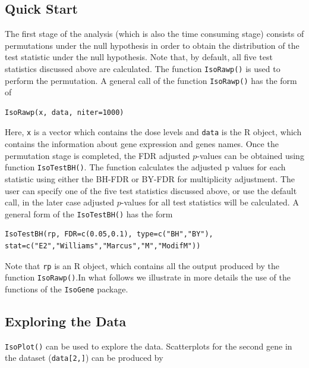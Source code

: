 \documentclass[10pt]{article}
\newenvironment{boxit}{\begin{lrbox}{\savepar}
\begin{minipage}[b]{5.0in}}
{\end{minipage}\end{lrbox}\fbox{\usebox{\savepar}}}
\begin{document}
\subsection{Quick Start}
The first stage of the analysis (which is also the time consuming stage) consists of permutations under the null hypothesis in order to obtain the distribution of the test statistic under the null hypothesis. Note that, by default, all five test statistics discussed above are calculated. The function \texttt{IsoRawp()} is used to perform the permutation. A general call of the function \texttt{IsoRawp()} has the form of
\begin{center}
\begin{boxit}
\begin{verbatim}
IsoRawp(x, data, niter=1000)
\end{verbatim}
\end{boxit}
\end{center}
Here, \texttt{x} is a vector which contains the dose levels and \texttt{data} is the R object, which contains the information about gene expression and genes names. Once the permutation stage is completed, the FDR adjusted $p$-values can be obtained using function \texttt{IsoTestBH()}. The function calculates the adjusted p values for each statistic using either the BH-FDR or BY-FDR for multiplicity adjustment. The user can specify one of the five test statistics discussed above, or use the default call, in the later case adjusted $p$-values for all test statistics will be calculated. A general form of the \texttt{IsoTestBH()} has the form
\begin{center}
\begin{boxit}
\begin{verbatim}
IsoTestBH(rp, FDR=c(0.05,0.1), type=c("BH","BY"),
stat=c("E2","Williams","Marcus","M","ModifM"))
\end{verbatim}
\end{boxit}
\end{center}
Note that \texttt{rp} is an R object, which contains all the output produced by the function \texttt{IsoRawp()}.\newline In what follows we illustrate in more details the use of the functions of the \texttt{IsoGene} package.

\subsection{Exploring the Data}

\texttt{IsoPlot()} can be used to explore the data. Scatterplots for the
second gene in the dataset (\texttt{data[2,]}) can be produced by
\end{document}
